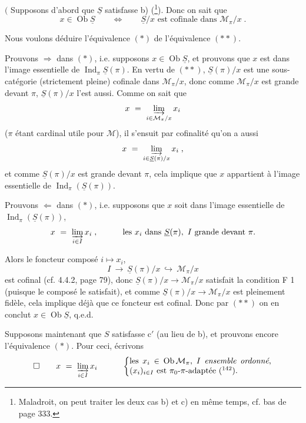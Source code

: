 \documentclass[11pt]{article}
\newcommand{\printedpage}[1]{\marginpar{\footnotesize p.~#1}}
\newcommand{\msp}[1]{\marginpar{\footnotesize [#1]}}
\DeclareMathOperator{\Ob}{Ob}
\DeclareMathOperator{\Ind}{Ind}
\begin{document}
\msp{page 332}

$\Bigg($ Supposons d'abord que $\underline{S}$ satisfasse b) (\footnote[141]{Maladroit, on peut traiter les deux cas b) et c) en même temps, cf. bas de page 333.}). Donc on sait que
\[
x \in \Ob\underline{S} \qquad \Longleftrightarrow \qquad \underline{S}/x \text{ est cofinale dans } \mathcal{M}_\pi/x \; . \tag*{$(**)$}
\]

Nous voulons déduire l'équivalence $(*)$ de l'équivalence $(**)$.

Prouvons $\Longrightarrow$ dans $(*)$, i.e. supposons $x \in \Ob\underline{S}$, et prouvons que $x$ est dans l'image essentielle de $\Ind_\pi\underline{S}(\pi)$. En vertu de $(**)$, $\underline{S}(\pi)/x$ est une sous-catégorie (strictement pleine) cofinale dans $\mathcal{M}_\pi/x$, donc comme $\mathcal{M}_\pi/x$ est grande devant $\pi$, $\underline{S}(\pi)/x$ l'est aussi. Comme on sait que
\[
x \ = \ \varinjlim_{i\in\mathcal{M}_\pi/x} x_i
\]
($\pi$ étant cardinal utile pour $\mathcal{M}$), il s'ensuit par cofinalité qu'on a aussi
\[
x \ = \ \varinjlim_{i\in\underline{S}(\pi)/x} x_i \; ,
\]
et comme $\underline{S}(\pi)/x$ est grande devant $\pi$, cela implique que $x$ appartient à l'image essentielle de $\Ind_\pi(\underline{S}(\pi))$.

Prouvons $\Longleftarrow$ dans $(*)$, i.e. supposons que $x$ soit dans l'image essentielle de $\Ind_\pi(\underline{S}(\pi))$,
\printedpage{126}
\msp{page 333}
\[
x \ = \ \varinjlim_{i\in I} x_i \; , \qquad\quad \text{les } x_i \text{ dans } \underline{S}(\pi),\ I \text{ grande devant } \pi.
\]

Alors le foncteur composé $i \longmapsto x_i$,
\[
I \ \longrightarrow \ \underline{S}(\pi)/x \ \hookrightarrow \ \mathcal{M}_\pi/x
\]
est cofinal (cf. 4.4.2, page 79), donc $\underline{S}(\pi)/x \longrightarrow \mathcal{M}_\pi/x$ satisfait la condition F 1 (puisque le composé le satisfait), et comme $\underline{S}(\pi)/x \longrightarrow \mathcal{M}_\pi/x$ est pleinement fidèle, cela implique déjà que ce foncteur est cofinal. Donc par $(**)$ on en conclut $x \in \Ob\underline{S}$, q.e.d.

Supposons maintenant que $S$ satisfasse c$'$ (au lieu de b), et prouvons encore l'équivalence $(*)$. Pour ceci, écrivons
\[
\square \qquad x \ = \ \varinjlim_{i\in I} x_i \qquad\quad
\left\{
\begin{minipage}[c]{0.5\textwidth}
les $x_i \in \Ob\mathcal{M}_\pi$, $I$ \textit{ensemble ordonné}, $(x_i)_{i\in I}$ est $\pi_0$-$\pi$-adaptée (\footnotemark[142]).
\end{minipage}
\right.
\]
\end{document}
